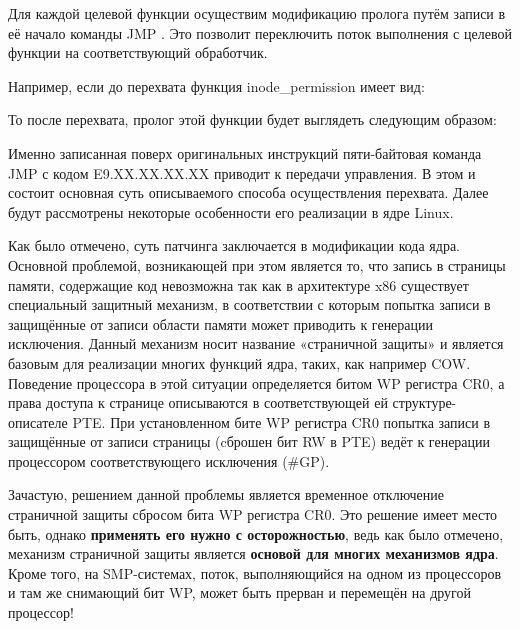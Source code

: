 \par Для каждой целевой функции осуществим модификацию пролога путём записи в её начало команды JMP . Это позволит переключить поток выполнения с целевой функции на соответствующий обработчик. \\ 

\par Например, если до перехвата функция inode\_permission имеет вид:

 

\par То после перехвата, пролог этой функции будет выглядеть следующим образом:

 

\par Именно записанная поверх оригинальных инструкций пяти-байтовая команда JMP с кодом E9.XX.XX.XX.XX приводит к передачи управления. В этом и состоит основная суть описываемого способа осуществления перехвата. Далее будут рассмотрены некоторые особенности его реализации в ядре Linux.

\par Как было отмечено, суть патчинга заключается в модификации кода ядра. Основной проблемой, возникающей при этом является то, что запись в страницы памяти, содержащие код невозможна так как в архитектуре x86 существует специальный защитный механизм, в соответствии с которым попытка записи в защищённые от записи области памяти может приводить к генерации исключения. Данный механизм носит название «страничной защиты» и является базовым для реализации многих функций ядра, таких, как например COW. Поведение процессора в этой ситуации определяется битом WP регистра CR0, а права доступа к странице описываются в соответствующей ей структуре-описателе PTE. При установленном бите WP регистра CR0 попытка записи в защищённые от записи страницы (cброшен бит RW в PTE) ведёт к генерации процессором соответствующего исключения (\#GP).

\par Зачастую, решением данной проблемы является временное отключение страничной защиты сбросом бита WP регистра CR0. Это решение имеет место быть, однако \textbf{применять его нужно с осторожностью}, ведь как было отмечено, механизм страничной защиты является \textbf{основой для многих механизмов ядра}. Кроме того, на SMP-системах, поток, выполняющийся на одном из процессоров и там же снимающий бит WP, может быть прерван и перемещён на другой процессор!

